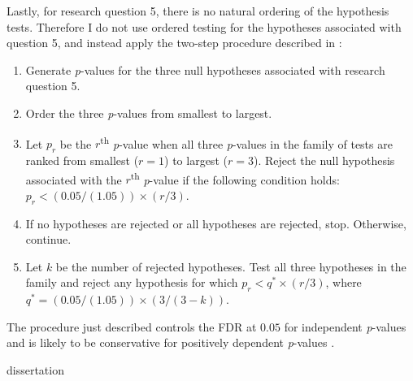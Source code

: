 \documentclass[11pt]{article}
\begin{document}
Lastly, for research question 5, there is no natural ordering of the hypothesis tests. Therefore I do not use ordered testing for the hypotheses associated with question 5, and instead apply the two-step procedure described in \citet{benjamini.06}: %
\begin{enumerate}
    \item Generate \textit{p}-values for the three null hypotheses associated with research question 5.
    \item Order the three \textit{p}-values from smallest to largest.
    \item Let $p_{r}$ be the $r$\textsuperscript{th} \textit{p}-value when all three \textit{p}-values in the family of tests are ranked from smallest ($r = 1$) to largest ($r = 3$). Reject the null hypothesis associated with the $r$\textsuperscript{th} \textit{p}-value if the following condition holds: $p_{r} < (0.05/(1.05)) \times (r/3)$. %
    
    \item If no hypotheses are rejected or all hypotheses are rejected, stop. Otherwise, continue.
    \item Let $k$ be the number of rejected hypotheses. Test all three hypotheses in the family and reject any hypothesis for which $p_{r}<q^{*}\times(r/3)$, where $q^{*} = (0.05/(1.05))\times(3/(3-k))$. 
\end{enumerate}
The procedure just described controls the FDR at $0.05$ for independent \textit{p}-values and is likely to be conservative for positively dependent \textit{p}-values \citep{benjamini.06}. 


\newpage
 {dissertation}
\end{document}

